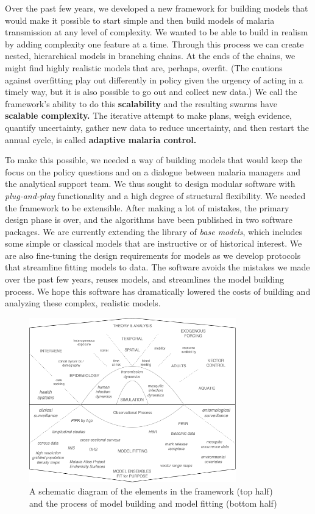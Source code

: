 \documentclass[
]{book}
\begin{document}
Over the past few years, we developed a new framework for building models that would make it possible to start simple and then build models of malaria transmission at any level of complexity. We wanted to be able to build in realism by adding complexity one feature at a time. Through this process we can create nested, hierarchical models in branching chains. At the ends of the chains, we might find highly realistic models that are, perhaps, overfit. (The cautions against overfitting play out differently in policy given the urgency of acting in a timely way, but it is also possible to go out and collect new data.) We call the framework's ability to do this \textbf{scalability} and the resulting swarms have \textbf{scalable complexity.} The iterative attempt to make plans, weigh evidence, quantify uncertainty, gather new data to reduce uncertainty, and then restart the annual cycle, is called \textbf{adaptive malaria control.}

To make this possible, we needed a way of building models that would
keep the focus on the policy questions and on a dialogue between malaria managers and the analytical support team. We thus sought to design modular software with \emph{plug-and-play} functionality and a high degree of structural flexibility. We needed the framework to be extensible. After making a lot of mistakes, the primary design phase is over, and the algorithms have been published in two software packages. We are currently extending the library of \emph{base models}, which includes some simple or classical models that are instructive or of historical interest. We are also fine-tuning the design requirements for models as we develop protocols that streamline fitting models to data. The software avoids the mistakes we made over the past few years, reuses models, and streamlines the model building process. We hope this software has dramatically lowered the costs of building and analyzing these complex, realistic models.

\begin{figure}
\centering
\includegraphics[width=0.8\textwidth,height=\textheight]{Figures/ScalableComplexity.png}
\caption{A schematic diagram of the elements in the framework (top half) and the process of model building and model fitting (bottom half)}
\end{figure}
\end{document}
